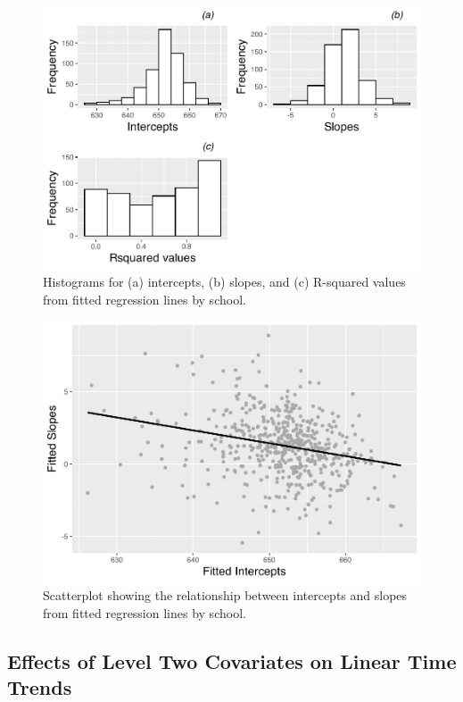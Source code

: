 \documentclass[
]{krantz}
\begin{document}
\begin{figure}

{\centering \includegraphics[width=0.6\linewidth]{bookdown-BeyondMLR_files/figure-latex/lon-histmat1-1} 

}

\caption{ Histograms for (a) intercepts, (b) slopes, and (c) R-squared values from fitted regression lines by school.}\label{fig:lon-histmat1}
\end{figure}

\begin{figure}

{\centering \includegraphics[width=0.6\linewidth]{bookdown-BeyondMLR_files/figure-latex/lon-scat5-1} 

}

\caption{Scatterplot showing the relationship between intercepts and slopes from fitted regression lines by school.}\label{fig:lon-scat5}
\end{figure}

\subsection{Effects of Level Two Covariates on Linear Time Trends}\label{lineartwostageL2effects}
\end{document}
